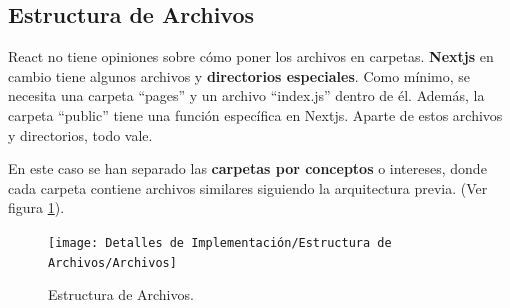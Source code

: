 \documentclass[12pt,twoside,titlepage]{report}
\begin{document}
\subsection{Estructura de Archivos}

React no tiene opiniones sobre cómo poner los archivos en carpetas. \textbf{Nextjs} en cambio tiene algunos archivos y \textbf{directorios especiales}. Como mínimo, se necesita una carpeta ``pages'' y un archivo ``index.js'' dentro de él. Además, la carpeta ``public'' tiene una función específica en Nextjs. Aparte de estos archivos y directorios, todo vale.

En este caso se han separado las \textbf{carpetas por conceptos} o intereses, donde cada carpeta contiene archivos similares siguiendo la arquitectura previa.
(Ver figura \ref{fig:Archivos}).

\begin{figure}[H]
    \centering
    \texttt{[image: Detalles de Implementación/Estructura de Archivos/Archivos]}
    \caption{Estructura de Archivos.}
    \label{fig:Archivos}
\end{figure}
\end{document}
